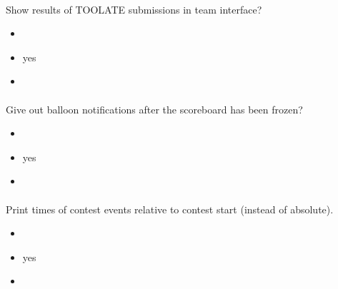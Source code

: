 \documentclass[a4paper,10pt,english,openany]{sphinxmanual}
\begin{document}
\paragraph{}
\label{\detokenize{configuration-reference:show-too-late-result}}
\sphinxAtStartPar
Show results of TOO\sphinxhyphen{}LATE submissions in team interface?
\begin{itemize}
\item {} 
\sphinxAtStartPar
{} 

\item {} 
\sphinxAtStartPar
{} yes

\item {} 
\sphinxAtStartPar
{} 

\end{itemize}


\paragraph{}
\label{\detokenize{configuration-reference:show-balloons-postfreeze}}
\sphinxAtStartPar
Give out balloon notifications after the scoreboard has been frozen?
\begin{itemize}
\item {} 
\sphinxAtStartPar
{} 

\item {} 
\sphinxAtStartPar
{} yes

\item {} 
\sphinxAtStartPar
{} 

\end{itemize}


\paragraph{}
\label{\detokenize{configuration-reference:show-relative-time}}
\sphinxAtStartPar
Print times of contest events relative to contest start (instead of absolute).
\begin{itemize}
\item {} 
\sphinxAtStartPar
{} 

\item {} 
\sphinxAtStartPar
{} yes

\item {} 
\sphinxAtStartPar
{} 

\end{itemize}
\end{document}
